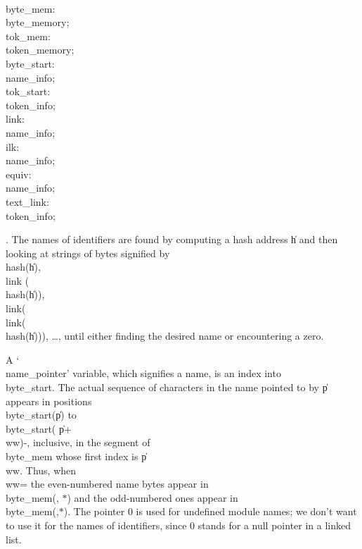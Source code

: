 \\{byte\_mem}\?:\?\\{byte\_memory};\6
\\{tok\_mem}\?:\?\\{token\_memory};\6
\\{byte\_start}\?:\?\\{name\_info};\6
\\{tok\_start}\?:\?\\{token\_info};\6
\\{link}\?:\?\\{name\_info};\6
\\{ilk}\?:\?\\{name\_info};\6
\\{equiv}\?:\?\\{name\_info};\6
\\{text\_link}\?:\?\\{token\_info};\par
\fi

. The names of identifiers are found by computing a hash address \|h and
then looking at strings of bytes signified by \\{hash}\?(\?\|h\?)\?, \\{link}%
\?(\?\\{hash}\?(\?\|h\?))\?,
\\{link}\?(\?\\{link}\?(\?\\{hash}\?(\?\|h\?)))\?, \dots, until either finding
the desired name
or encountering a zero.

A `\\{name\_pointer}' variable, which signifies a name, is an index into
\\{byte\_start}. The actual sequence of characters in the name pointed to by
\|p appears in positions \\{byte\_start}\?(\?\|p\?)\? to \\{byte\_start}\?(\?%
\|p\?+\?\\{ww}\?)-, inclusive,
in the segment of \\{byte\_mem} whose first index is \|p\?\?%
\\{ww}. Thus, when
\\{ww}\?= the even-numbered name bytes appear in \\{byte\_mem}\?(\?,\?%
\hbox{$*$}\?)\?
and the odd-numbered ones appear in \\{byte\_mem}\?(\?,\?\hbox{$*$}\?)\?.
The pointer 0 is used for undefined module names; we don't
want to use it for the names of identifiers, since 0 stands for a null
pointer in a linked list.

